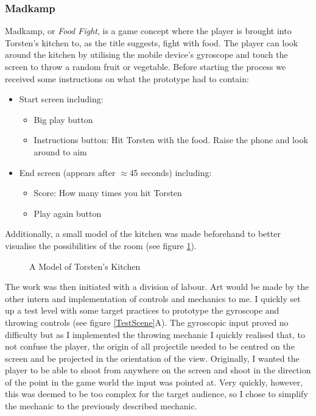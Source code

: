 \subsubsection{Madkamp}
Madkamp, or \textit{Food Fight}, is a game concept where the player is brought into Torsten's kitchen to, as the title suggests, fight with food. The player can look around the kitchen by utilising the mobile device's gyroscope and touch the screen to throw a random fruit or vegetable. \newline
Before starting the process we received some instructions on what the prototype had to contain:
\begin{itemize}
  \item Start screen including:
  \begin{itemize}
    \item Big play button
    \item Instructions button: Hit Torsten with the food. Raise the phone and look around to aim
  \end{itemize}
  \item End screen (appears after $\approx$45 seconds) including:
  \begin{itemize}
    \item Score: How many times you hit Torsten
    \item Play again button
  \end{itemize}
\end{itemize}
Additionally, a small model of the kitchen was made beforehand to better visualise the possibilities of the room (see figure \ref{kitchenmodel}).
\begin{center}
  \begin{figure}[!htb]
    \noindent{}
    \caption{A Model of Torsten's Kitchen}
    \label{kitchenmodel}
  \end{figure}
\end{center}
The work was then initiated with a division of labour. Art would be made by the other intern and implementation of controls and mechanics to me. I quickly set up a test level with some target practices to prototype the gyroscope and throwing controls (see figure \ref{TestScene}A). The gyroscopic input proved no difficulty but as I implemented the throwing mechanic I quickly realised that, to not confuse the player, the origin of all projectile needed to be centred on the screen and be projected in the orientation of the view. Originally, I wanted the player to be able to shoot from anywhere on the screen and shoot in the direction of the point in the game world the input was pointed at. Very quickly, however, this was deemed to be too complex for the target audience, so I chose to simplify the mechanic to the previously described mechanic.

